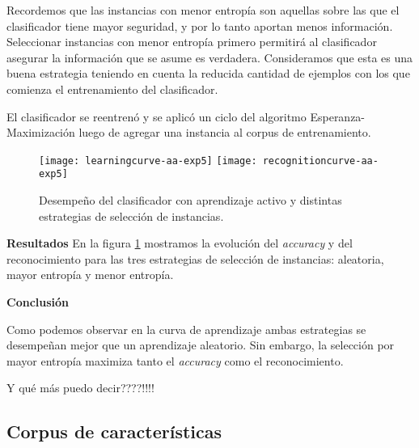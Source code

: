 Recordemos que las instancias con menor entropía son aquellas sobre las que el clasificador tiene mayor seguridad, y por lo tanto aportan menos información. Seleccionar instancias con menor entropía primero permitirá al clasificador asegurar la información que se asume es verdadera. Consideramos que esta es una buena estrategia teniendo en cuenta la reducida cantidad de ejemplos con los que comienza el entrenamiento del clasificador.

El clasificador se reentrenó y se aplicó un ciclo del algoritmo Esperanza-Maximización luego de agregar una instancia al corpus de entrenamiento.


\begin{figure}[h!]\label{fig-aa-comparision}
\centering
\texttt{[image: learningcurve-aa-exp5]}
\texttt{[image: recognitioncurve-aa-exp5]}
\caption{Desempeño del clasificador con aprendizaje activo y distintas estrategias de selección de instancias.}
\end{figure}
\vspace{3 mm}

\textbf{Resultados} En la figura \ref{fig-aa-comparision} mostramos la evolución del \textit{accuracy} y del reconocimiento para las tres estrategias de selección de instancias: aleatoria, mayor entropía y menor entropía.


\vspace{3 mm}

\textbf{Conclusión}

Como podemos observar en la curva de aprendizaje ambas estrategias se desempeñan mejor que un aprendizaje aleatorio. Sin embargo, la selección por mayor entropía maximiza tanto el \textit{accuracy} como el reconocimiento.

Y qué más puedo decir????!!!!

\subsection{Corpus de características}


